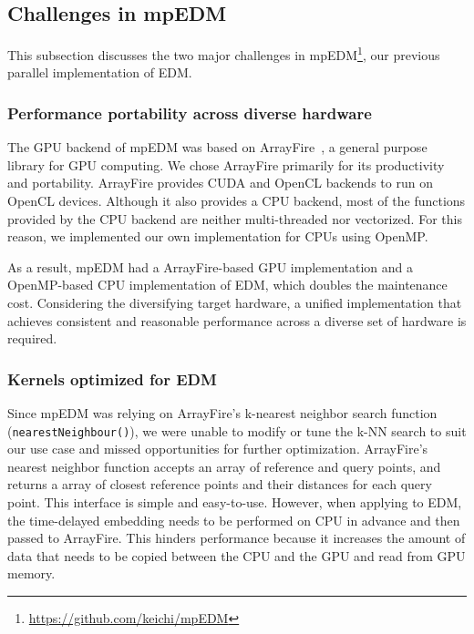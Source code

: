 \documentclass[sigconf]{acmart}
\begin{document}
\subsection{Challenges in mpEDM}\label{sec:challenges}

This subsection discusses the two major challenges in
mpEDM\footnote{\url{https://github.com/keichi/mpEDM}}, our previous
parallel implementation of EDM\@.

\subsubsection{Performance portability across diverse hardware}\label{sec:portability}

The GPU backend of mpEDM was based on ArrayFire~\cite{Malcolm2012}, a general
purpose library for GPU computing. We chose ArrayFire primarily for its
productivity and portability. ArrayFire provides CUDA and OpenCL backends to
run on OpenCL devices. Although it also provides a CPU backend, most of the
functions provided by the CPU backend are neither multi-threaded nor
vectorized. For this reason, we implemented our own implementation for CPUs
using OpenMP\@.

As a result, mpEDM had a ArrayFire-based GPU implementation and a OpenMP-based
CPU implementation of EDM, which doubles the maintenance cost. Considering the
diversifying target hardware, a unified implementation that achieves
consistent and reasonable performance across a diverse set of hardware is
required.

\subsubsection{Kernels optimized for EDM}\label{sec:flexibility}

Since mpEDM was relying on ArrayFire's k-nearest neighbor search function
(\texttt{nearestNeighbour()}), we were unable to modify or tune the k-NN
search to suit our use case and missed opportunities for further optimization.
ArrayFire's nearest neighbor function accepts an array of reference and query
points, and returns a array of closest reference points and their distances
for each query point. This interface is simple and easy-to-use. However, when
applying to EDM, the time-delayed embedding needs to be performed on CPU in
advance and then passed to ArrayFire. This hinders performance because it
increases the amount of data that needs to be copied between the CPU and the
GPU and read from GPU memory.
\end{document}
